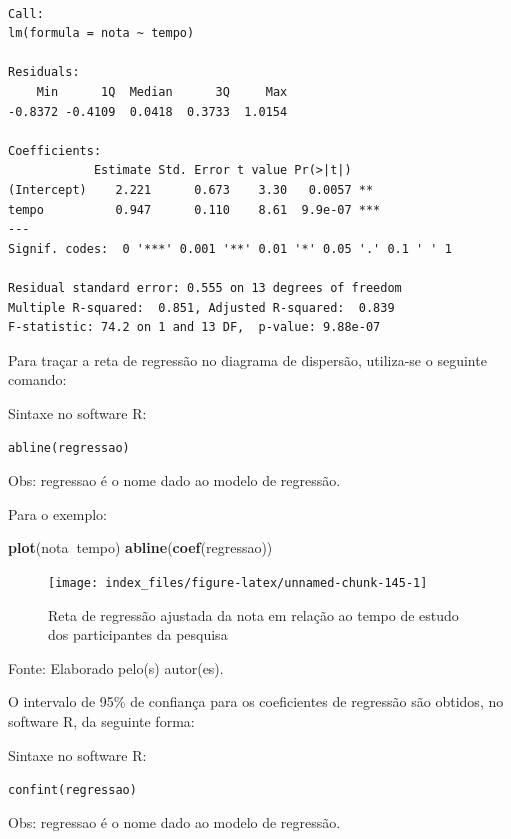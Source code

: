 \documentclass[12pt,brazil,oneside]{book}
\newenvironment{Shaded}{\begin{snugshade}}{\end{snugshade}}
\newcommand{\KeywordTok}[1]{\textcolor[rgb]{0.13,0.29,0.53}{\textbf{#1}}}
\newcommand{\NormalTok}[1]{#1}
\newcommand{\OperatorTok}[1]{\textcolor[rgb]{0.81,0.36,0.00}{\textbf{#1}}}
\begin{document}
\begin{verbatim}

Call:
lm(formula = nota ~ tempo)

Residuals:
    Min      1Q  Median      3Q     Max 
-0.8372 -0.4109  0.0418  0.3733  1.0154 

Coefficients:
            Estimate Std. Error t value Pr(>|t|)    
(Intercept)    2.221      0.673    3.30   0.0057 ** 
tempo          0.947      0.110    8.61  9.9e-07 ***
---
Signif. codes:  0 '***' 0.001 '**' 0.01 '*' 0.05 '.' 0.1 ' ' 1

Residual standard error: 0.555 on 13 degrees of freedom
Multiple R-squared:  0.851, Adjusted R-squared:  0.839 
F-statistic: 74.2 on 1 and 13 DF,  p-value: 9.88e-07
\end{verbatim}

Para traçar a reta de regressão no diagrama de dispersão, utiliza-se o seguinte comando:

Sintaxe no software R:

\texttt{abline(regressao)}

Obs: regressao é o nome dado ao modelo de regressão.

Para o exemplo:

\begin{Shaded}
\begin{Highlighting}[]
\KeywordTok{plot}\NormalTok{(nota}\OperatorTok{~}\NormalTok{tempo)}
\KeywordTok{abline}\NormalTok{(}\KeywordTok{coef}\NormalTok{(regressao))}
\end{Highlighting}
\end{Shaded}

\begin{figure}[H]

{\centering \texttt{[image: index\_files/figure-latex/unnamed-chunk-145-1]} 

}

\caption{Reta de regressão ajustada da nota em relação ao tempo de estudo dos participantes da pesquisa}\label{fig:unnamed-chunk-145}
\end{figure}

Fonte: Elaborado pelo(s) autor(es).

O intervalo de 95\% de confiança para os coeficientes de regressão são obtidos, no software R, da seguinte forma:

Sintaxe no software R:

\texttt{confint(regressao)}

Obs: regressao é o nome dado ao modelo de regressão.
\end{document}
